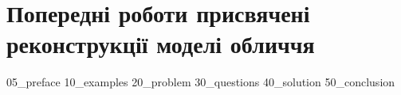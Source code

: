 \chapter{Попередні роботи присвячені реконструкції моделі обличчя}
{05_preface}
{10_examples}
{20_problem}
{30_questions}
{40_solution}
{50_conclusion}
